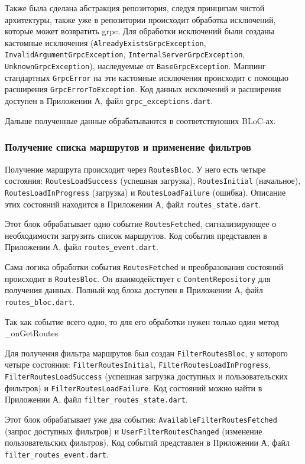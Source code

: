 Также была сделана абстракция репозитория, следуя принципам чистой архитектуры, также уже в репозитории происходит обработка исключений, которые может возвратить grpc. Для обработки исключений были созданы кастомные исключения (\texttt{AlreadyExistsGrpcException}, \texttt{InvalidArgumentGrpcException}, \texttt{InternalServerGrpcException}, \texttt{UnknownGrpcException}), наследуемые от \texttt{BaseGrpcException}. Маппинг стандартных \texttt{GrpcError} на эти кастомные исключения происходит с помощью расширения \texttt{GrpcErrorToException}. Код данных исключений и расширения доступен в Приложении А, файл \texttt{grpc\_exceptions.dart}.

Дальше полученные данные обрабатываются в соответствуюших BLoC-ах.

\subsubsection*{Получение списка маршрутов и применение фильтров}

Получение маршрута происходит через \texttt{RoutesBloc}. У него есть четыре состояния: \texttt{RoutesLoadSuccess} (успешная загрузка), \texttt{RoutesInitial} (начальное), \texttt{RoutesLoadInProgress} (загрузка) и \texttt{RoutesLoadFailure} (ошибка). Описание этих состояний находится в Приложении А, файл \texttt{routes\_state.dart}.

Этот блок обрабатывает одно событие \texttt{RoutesFetched}, сигнализирующее о необходимости загрузить список маршрутов. Код события представлен в Приложении А, файл \texttt{routes\_event.dart}.

Сама логика обработки события \texttt{RoutesFetched} и преобразования состояний происходит в \texttt{RoutesBloc}. Он взаимодействует с \texttt{ContentRepository} для получения данных. Полный код блока доступен в Приложении А, файл \texttt{routes\_bloc.dart}.

Так как событие всего одно, то для его обработки нужен только один метод \_onGetRoutes

Для получения фильтра маршрутов был создан \texttt{FilterRoutesBloc}, у которого четыре состояния: \texttt{FilterRoutesInitial}, \texttt{FilterRoutesLoadInProgress}, \texttt{FilterRoutesLoadSuccess} (успешная загрузка доступных и пользовательских фильтров) и \texttt{FilterRoutesLoadFailure}. Код состояний можно найти в Приложении А, файл \texttt{filter\_routes\_state.dart}.

Этот блок обрабатывает уже два события: \texttt{AvailableFilterRoutesFetched} (запрос доступных фильтров) и \texttt{UserFilterRoutesChanged} (изменение пользовательских фильтров). Код событий представлен в Приложении А, файл \texttt{filter\_routes\_event.dart}.

